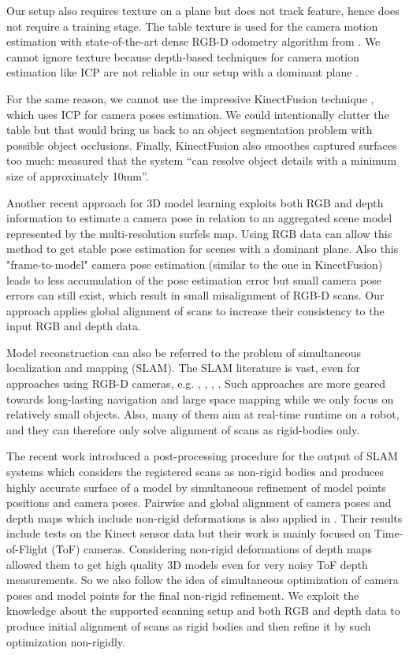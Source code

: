 \documentclass[letterpaper, 10 pt, conference]{ieeeconf}  %
\begin{document}
Our setup also requires 
texture on a plane but does not track feature, hence does not require a training stage.
The table texture is used for the camera motion estimation 
with state-of-the-art dense RGB-D odometry algorithm from \cite{steinbrucker2011real}.
We cannot ignore texture because depth-based
techniques for camera motion estimation like ICP \cite{besl1992method} 
are not reliable in our setup with a dominant plane \cite{rusinkiewicz2001efficient}.


For the same reason, we cannot use
the impressive KinectFusion technique \cite{newcombe2011kinectfusion},
which uses ICP for camera poses estimation.
We could intentionally clutter the table but that would bring us back to
an object segmentation problem with possible object occlusions.
Finally, KinectFusion also smoothes captured surfaces too much: \cite{meister2012when} measured that
the system ``can resolve object details with a minimum size of approximately 10mm''.

Another recent approach \cite{stuckler2012model} for 3D model learning 
exploits both RGB and depth information to estimate a camera pose 
in relation to an aggregated scene model represented by the multi-resolution surfels map.
Using RGB data can allow this method to get stable pose estimation
for scenes with a dominant plane. Also this "frame-to-model" camera pose estimation (similar to the one in 
KinectFusion) leads to less accumulation of the pose estimation error
but small camera pose errors can still exist, which result in
small misalignment of RGB-D scans. Our approach applies global alignment of scans
to increase their consistency to the input RGB and depth data.

Model reconstruction can also be referred to the problem of simultaneous localization
and mapping (SLAM). The SLAM literature is vast, even for approaches using RGB-D
cameras, e.g. \cite{stuckler2012integrating},
\cite{endres2012evaluation}, \cite{henry2012rgb}, \cite{strasdat2011double}. Such approaches are more geared
towards long-lasting navigation and large space mapping while we only focus on relatively small objects.
Also, many of them aim at
real-time runtime on a robot, and they can therefore only solve alignment of scans 
as rigid-bodies only. 

The recent work \cite{ruhnke2012highly} introduced a post-processing procedure for the output of SLAM systems
which considers the registered scans as non-rigid bodies and produces highly accurate
surface of a model by simultaneous refinement of model points positions and camera poses.
Pairwise and global alignment of camera poses and depth maps which include non-rigid 
deformations is also applied in \cite{cui2012algorithms}. Their results include tests on the Kinect
sensor data but their work is mainly focused on Time-of-Flight (ToF) cameras. Considering non-rigid deformations 
of depth maps allowed them to get high quality 3D models even for very noisy ToF depth measurements.
So we also follow the idea of simultaneous optimization of camera poses and model points 
for the final non-rigid refinement. We exploit the knowledge 
about the supported scanning setup and both RGB and depth 
data to produce initial alignment of scans as rigid bodies
and then refine it by such optimization non-rigidly.
\end{document}
